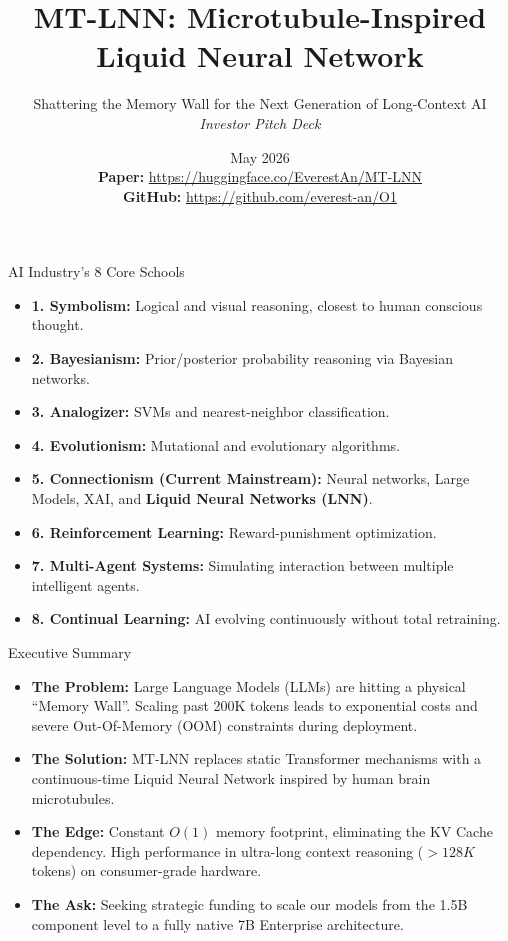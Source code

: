﻿\documentclass[aspectratio=169, 10pt]{beamer}
\title{MT-LNN: Microtubule-Inspired Liquid Neural Network}
\subtitle{Shattering the Memory Wall for the Next Generation of Long-Context AI \\ \textit{Investor Pitch Deck}}
\author{\Huge \aeonik{Awareness}}
\date{May 2026 \\[1em]
\footnotesize
\textbf{Paper:} \url{https://huggingface.co/EverestAn/MT-LNN} \\
\textbf{GitHub:} \url{https://github.com/everest-an/O1}
}
\begin{document}
\frame{\titlepage}

\begin{frame}{AI Industry's 8 Core Schools}
\begin{itemize}
    \item \textbf{1. Symbolism:} Logical and visual reasoning, closest to human conscious thought.
    \item \textbf{2. Bayesianism:} Prior/posterior probability reasoning via Bayesian networks.
    \item \textbf{3. Analogizer:} SVMs and nearest-neighbor classification.
    \item \textbf{4. Evolutionism:} Mutational and evolutionary algorithms.
    \item \textbf{5. Connectionism (Current Mainstream):} Neural networks, Large Models, XAI, and \textbf{Liquid Neural Networks (LNN)}.
    \item \textbf{6. Reinforcement Learning:} Reward-punishment optimization.
    \item \textbf{7. Multi-Agent Systems:} Simulating interaction between multiple intelligent agents.
    \item \textbf{8. Continual Learning:} AI evolving continuously without total retraining.
\end{itemize}
\end{frame}

\begin{frame}{Executive Summary}
\begin{itemize}
    \item \textbf{The Problem:} Large Language Models (LLMs) are hitting a physical ``Memory Wall''. Scaling past 200K tokens leads to exponential costs and severe Out-Of-Memory (OOM) constraints during deployment.
    \item \textbf{The Solution:} MT-LNN replaces static Transformer mechanisms with a continuous-time Liquid Neural Network inspired by human brain microtubules.
    \item \textbf{The Edge:} Constant $O(1)$ memory footprint, eliminating the KV Cache dependency. High performance in ultra-long context reasoning ($>128K$ tokens) on consumer-grade hardware.
    \item \textbf{The Ask:} Seeking strategic funding to scale our models from the 1.5B component level to a fully native 7B Enterprise architecture.
\end{itemize}
\end{frame}
\end{document}
